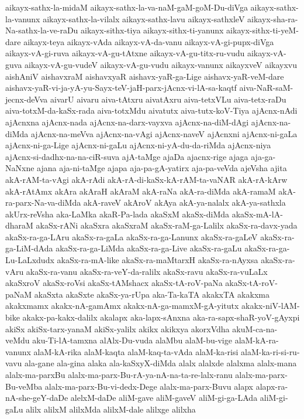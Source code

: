 {aikayx-sathx-la-midaM
aikayx-sathx-la-va-naM-gaM-goM-Du-diVga
aikayx-sathx-la-vanunx
aikayx-sathx-la-vilalx
aikayx-sathx-lavu
aikayx-sathxleV
aikayx-sha-ra-Na-sathx-la-ve-raDu
aikayx-sithx-tiya
aikayx-sithx-ti-yanunx
aikayx-sithx-ti-yeM-dare
aikayx-teya
aikayx-vAda
aikayx-vA-da-vanu
aikayx-vA-gi-pupx-diVga
aikayx-vA-gi-ruva
aikayx-vA-gu-tAtxne
aikayx-vA-gu-titx-ru-vudu
aikayx-vA-guva
aikayx-vA-gu-vudeV
aikayx-vA-gu-vudu
aikayx-vanunx
aikayxveV
aikayxvu
aishAniV
aishavxraM
aishavxyaR
aishavx-yaR-ga-Lige
aishavx-yaR-veM-dare
aishavx-yaR-vi-ja-yA-yu-Sayx-teV-jaH-parx-jAcnx-vi-lA-sa-kaqtf
aiva-NaR-saM-jecnx-deVva
aivarU
aivaru
aiva-tAtxru
aivatAxru
aiva-tetxVLu
aiva-tetx-raDu
aiva-totxM-da-kaSx-rada
aiva-totxMdu
aivatutx
aiva-tutx-koV-Tiya
ajAcnx-nAdi
ajAcnxna
ajAcnx-nada
ajAcnx-na-darx-vayxva
ajAcnx-na-diM-dAgi
ajAcnx-na-diMda
ajAcnx-na-meVva
ajAcnx-na-vAgi
ajAcnx-naveV
ajAcnxni
ajAcnx-ni-gaLa
ajAcnx-ni-ga-Lige
ajAcnx-ni-gaLu
ajAcnx-ni-yA-du-da-riMda
ajAcnx-niya
ajAcnx-si-dadhx-na-na-ciR-suva
ajA-taMge
ajaDa
ajacnx-rige
ajaga
aja-ga-NaNxne
ajana
aja-ni-taMge
ajapa
aja-pa-gA-yatirx
aja-pa-veVda
ajeVsha
ajita
akA-rAM-ta-vAgi
akA-rAdi
akA-rA-di-kaSx-kA-rAM-ta-vaNAR
akA-rA-kArw
akA-rAtAmx
akAra
akAraH
akAraM
akA-raNa
akA-ra-diMda
akA-ramaM
akA-ra-parx-Na-va-diMda
akA-raveV
akAroV
akAya
akA-ya-nalalx
akA-ya-sathxla
akUrx-reVsha
aka-LaMka
akaR-Pa-lada
akaSxM
akaSx-diMda
akaSx-mA-lA-dharaM
akaSx-rANi
akaSxra
akaSxraM
akaSx-raM-ga-Lalilx
akaSx-ra-davx-yada
akaSx-ra-ga-LAru
akaSx-ra-gaLa
akaSx-ra-ga-Lanunx
akaSx-ra-gaLeV
akaSx-ra-ga-LiM-dAda
akaSx-ra-ga-LiMda
akaSx-ra-ga-Live
akaSx-ra-gaLu
akaSx-ra-ga-Lu-LaLxdudx
akaSx-ra-mA-like
akaSx-ra-maMtarxH
akaSx-ra-nAyxsa
akaSx-ra-vAru
akaSx-ra-vanu
akaSx-ra-veY-da-ralilx
akaSx-ravu
akaSx-ra-vuLaLx
akaSxroV
akaSx-roVsi
akaSx-tAMshacx
akaSx-tA-roV-paNa
akaSx-tA-roV-paNaM
akaSxta
akaSxte
akaSx-ya-rUpa
aka-Ta-kaTA
akakxTA
akakxma
akakxmamx
akakx-nA-gamAmx
akakx-nA-ga-mamxM-gA-yitutx
akakx-niV-lAM-bike
akakx-pa-kakx-dalilx
akalapx
aka-lapx-sAnxna
aka-ra-sapx-shaR-yoV-gAyxpi
akiSx
akiSx-tarx-yanaM
akiSx-yalilx
akikx
akikxya
akorxVdha
akuM-ca-na-veMdu
aku-Ti-lA-tamxna
alAlx-Du-vuda
alaMbu
alaM-bu-vige
alaM-kA-ra-vanunx
alaM-kA-rika
alaM-kaqta
alaM-kaq-ta-vAda
alaM-ka-risi
alaM-ka-ri-si-ru-vavu
ala-gane
ala-gina
alaka
ala-kaSxyX-diMda
alalx
alalxde
alalxma
alalx-mana
alalx-ma-parxBu
alalx-ma-parx-Bu-rA-ya-nA-na-ta-re-lalx-ranu
alalx-ma-parx-Bu-veMba
alalx-ma-parx-Bu-vi-dedx-Dege
alalx-ma-parx-Buvu
alapx
alapx-ra-nA-she-geY-daDe
alelxM-daDe
aliM-gave
aliM-gaveV
aliM-gi-ga-LAda
aliM-gi-gaLu
alilx
alilxM
alilxMda
alilxM-dale
alilxge
alilxha
}
